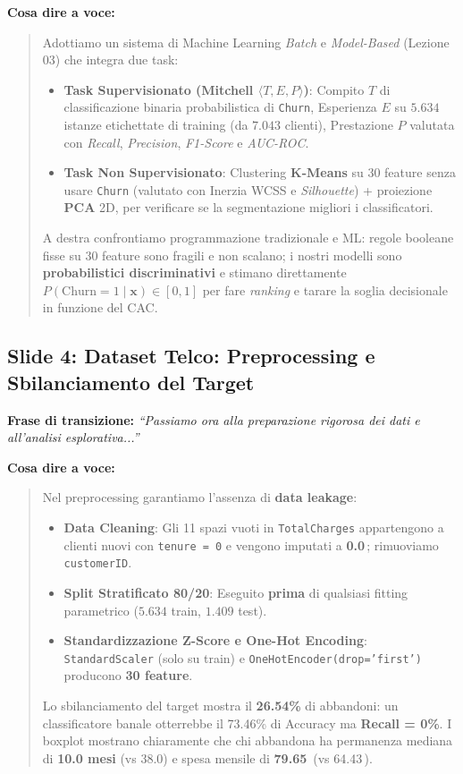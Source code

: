 \documentclass[11pt, a4paper]{article}
\begin{document}
\noindent \textbf{Cosa dire a voce:}
\begin{quote}
Adottiamo un sistema di Machine Learning \textit{Batch} e \textit{Model-Based} (Lezione 03) che integra due task:
\begin{itemize}
    \item \textbf{Task Supervisionato (Mitchell $\langle T, E, P \rangle$)}: Compito $T$ di classificazione binaria probabilistica di \texttt{Churn}, Esperienza $E$ su $5.634$ istanze etichettate di training (da $7.043$ clienti), Prestazione $P$ valutata con \textit{Recall}, \textit{Precision}, \textit{F1-Score} e \textit{AUC-ROC}.
    \item \textbf{Task Non Supervisionato}: Clustering \textbf{K-Means} su $30$ feature senza usare \texttt{Churn} (valutato con Inerzia WCSS e \textit{Silhouette}) + proiezione \textbf{PCA} 2D, per verificare se la segmentazione migliori i classificatori.
\end{itemize}
A destra confrontiamo programmazione tradizionale e ML: regole booleane fisse su $30$ feature sono fragili e non scalano; i nostri modelli sono \textbf{probabilistici discriminativi} e stimano direttamente $P(\text{Churn}=1 \mid \mathbf{x}) \in [0, 1]$ per fare \textit{ranking} e tarare la soglia decisionale in funzione del CAC.
\end{quote}

\subsection*{Slide 4: Dataset Telco: Preprocessing e Sbilanciamento del Target}
\noindent \textbf{Frase di transizione:} \textit{``Passiamo ora alla preparazione rigorosa dei dati e all'analisi esplorativa...''}

\noindent \textbf{Cosa dire a voce:}
\begin{quote}
Nel preprocessing garantiamo l'assenza di \textbf{data leakage}:
\begin{itemize}
    \item \textbf{Data Cleaning}: Gli 11 spazi vuoti in \texttt{TotalCharges} appartengono a clienti nuovi con \texttt{tenure = 0} e vengono imputati a \textbf{0.0\,\texteuro}; rimuoviamo \texttt{customerID}.
    \item \textbf{Split Stratificato 80/20}: Eseguito \textbf{prima} di qualsiasi fitting parametrico ($5.634$ train, $1.409$ test).
    \item \textbf{Standardizzazione Z-Score e One-Hot Encoding}: \texttt{StandardScaler} (solo su train) e \texttt{OneHotEncoder(drop='first')} producono \textbf{30 feature}.
\end{itemize}
Lo sbilanciamento del target mostra il \textbf{26.54\%} di abbandoni: un classificatore banale otterrebbe il 73.46\% di Accuracy ma \textbf{Recall = 0\%}. I boxplot mostrano chiaramente che chi abbandona ha permanenza mediana di \textbf{10.0 mesi} (vs 38.0) e spesa mensile di \textbf{79.65\,\texteuro} (vs 64.43\,\texteuro).
\end{quote}
\end{document}
